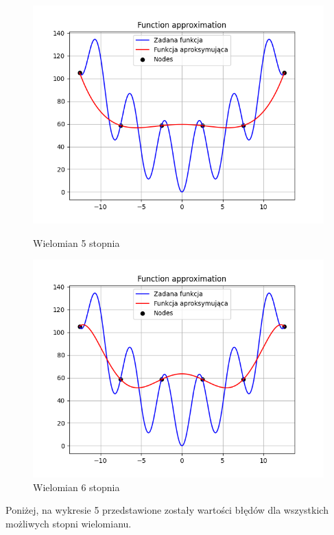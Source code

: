 \documentclass{article}
\begin{document}
\begin{figure}[H]
\begin{minipage}[b]{0.49\textwidth}
    \begin{minipage}[b]{\textwidth}
      \includegraphics[width=\textwidth]{img03.png}
      \caption{Wielomian 5 stopnia}
    \end{minipage}
    \vspace*{\fill}
    \begin{minipage}[b]{\textwidth}
      \includegraphics[width=\textwidth]{img04.png}
      \caption{Wielomian 6 stopnia}
    \end{minipage}
  \end{minipage}
\end{figure}

Poniżej, na wykresie 5 przedstawione zostały wartości błędów dla wszystkich możliwych stopni wielomianu.
\end{document}

